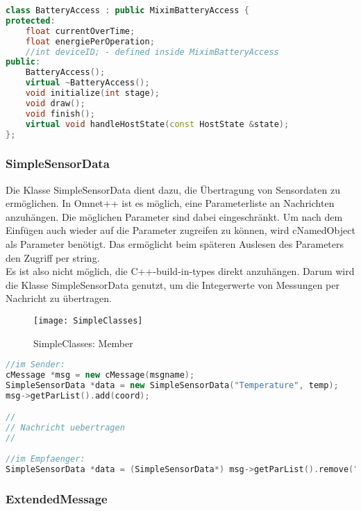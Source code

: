 \begin{lstlisting}[language=C++, label=lst:BatteryAccess, caption=BatteryAccess]
class BatteryAccess : public MiximBatteryAccess {
protected:
    float currentOverTime;
    float energiePerOperation;
    //int deviceID; - defined inside MiximBatteryAccess
public:
    BatteryAccess();
    virtual ~BatteryAccess();
    void initialize(int stage);
    void draw();
    void finish();
    virtual void handleHostState(const HostState &state);
};
\end{lstlisting}

\subsubsection{SimpleSensorData}

Die Klasse SimpleSensorData dient dazu, die Übertragung von Sensordaten zu ermöglichen. In Omnet++ ist es möglich, eine Parameterliste an Nachrichten anzuhängen. Die möglichen Parameter sind dabei eingeschränkt. Um nach dem Einfügen auch wieder auf die Parameter zugreifen zu können, wird cNamedObject als Parameter benötigt. Das ermöglicht beim späteren Auslesen des Parameters den Zugriff per string.\\
Es ist also nicht möglich, die C++-build-in-types direkt anzuhängen. Darum wird die Klasse SimpleSensorData genutzt, um die Integerwerte von Messungen per Nachricht zu übertragen.

\begin{figure}[htbp]
\centering
\caption{SimpleClasses: Member}
\texttt{[image: SimpleClasses]}
\end{figure}

\begin{minipage}{\textwidth}
\begin{lstlisting}[language=C++, label=lst:SimpleExample, caption=Beispiel für Senden und Empfangen mit Parameterliste]
//im Sender:
cMessage *msg = new cMessage(msgname);
SimpleSensorData *data = new SimpleSensorData("Temperature", temp);
msg->getParList().add(coord);

//
// Nachricht uebertragen    
//  
  
//im Empfaenger:  
SimpleSensorData *data = (SimpleSensorData*) msg->getParList().remove("Temperature");
\end{lstlisting}
\end{minipage}
\subsubsection{ExtendedMessage}

